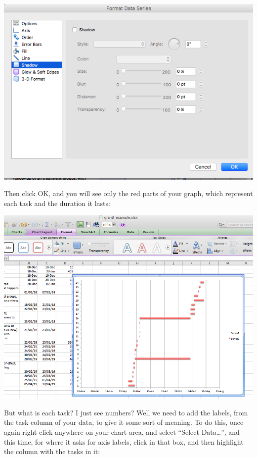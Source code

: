\documentclass[]{book}
\theoremstyle{definition}
\theoremstyle{definition}
\theoremstyle{definition}
\theoremstyle{remark}
\begin{document}
\includegraphics{imgs/gantt_no_snadow.png}

Then click OK, and you will see only the red parts of your graph, which
represent each task and the duration it lasts:

\includegraphics{imgs/gantt_blue_cleared.png}

But what is each task? I just see numbers? Well we need to add the
labels, from the task column of your data, to give it some sort of
meaning. To do this, once again right click anywhere on your chart area,
and select ``Select Data\ldots{}'', and this time, for where it asks for
axis labels, click in that box, and then highlight the column with the
tasks in it:
\end{document}
